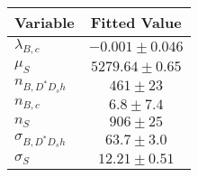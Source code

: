 \begin{tabular}[t]{lc}
\hline
Variable &Fitted Value\\
\hline\hline
$\lambda_{B,c}$&$-0.001\pm0.046$\\
\hline
$\mu_S$&$5279.64\pm0.65$\\
\hline
$n_{B, D^* D_s h}$&$461\pm23$\\
\hline
$n_{B,c}$&$6.8\pm7.4$\\
\hline
$n_S$&$906\pm25$\\
\hline
$\sigma_{B, D^* D_s h}$&$63.7\pm3.0$\\
\hline
$\sigma_S$&$12.21\pm0.51$\\
\hline
\end{tabular}
